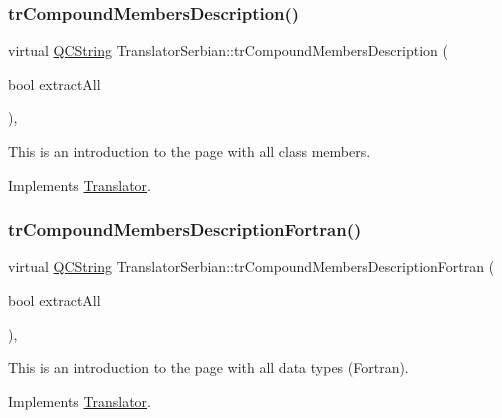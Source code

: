 \subsubsection{\texorpdfstring{trCompoundMembersDescription()}{trCompoundMembersDescription()}}
{\footnotesize\ttfamily virtual \mbox{\hyperlink{class_q_c_string}{Q\+C\+String}} Translator\+Serbian\+::tr\+Compound\+Members\+Description (\begin{DoxyParamCaption}\item[{bool}]{extract\+All }\end{DoxyParamCaption})\hspace{0.3cm}{\ttfamily [inline]}, {\ttfamily [virtual]}}

This is an introduction to the page with all class members. 

Implements \mbox{\hyperlink{class_translator}{Translator}}.

\mbox{\label{class_translator_serbian_a19d27c5b3b5ae805c8fd50aac05a131b}} 
\subsubsection{\texorpdfstring{trCompoundMembersDescriptionFortran()}{trCompoundMembersDescriptionFortran()}}
{\footnotesize\ttfamily virtual \mbox{\hyperlink{class_q_c_string}{Q\+C\+String}} Translator\+Serbian\+::tr\+Compound\+Members\+Description\+Fortran (\begin{DoxyParamCaption}\item[{bool}]{extract\+All }\end{DoxyParamCaption})\hspace{0.3cm}{\ttfamily [inline]}, {\ttfamily [virtual]}}

This is an introduction to the page with all data types (Fortran). 

Implements \mbox{\hyperlink{class_translator}{Translator}}.

\mbox{\label{class_translator_serbian_a0581252d4bc3285f8a2fd22769f024c7}} 
